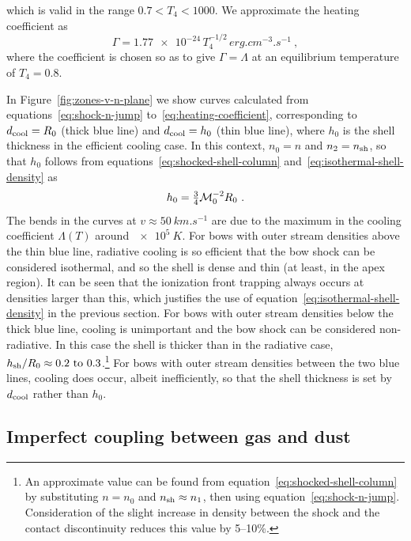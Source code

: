 \message{ !name(dusty-bow-wave.tex)}\documentclass[useAMS, usenatbib, a4paper]{mnras}
\begin{document}
which is valid in the range \(0.7 < T_4 < 1000\).  We approximate the heating coefficient as
\begin{equation}
  \label{eq:heating-coefficient}
  \Gamma = \num{1.77e-24} \, T_4^{-1/2} \, \si{erg.cm^{-3}.s^{-1}} \ ,
\end{equation}
where the coefficient is chosen so as to give \(\Gamma = \Lambda\) at
an equilibrium temperature of \(T_4 = 0.8\).

In Figure~\ref{fig:zones-v-n-plane} we show curves calculated from
equations~\eqref{eq:shock-n-jump} to~\eqref{eq:heating-coefficient},
corresponding to \(d_{\text{cool}} = R_0\) (thick blue line) and
\(d_{\text{cool}} = h_0\) (thin blue line), where \(h_0\) is the shell
thickness in the efficient cooling case.  In this context, \(n_0 = n\)
and \(n_2 = n_{\text{sh}}\), so that \(h_0\) follows from
equations~\eqref{eq:shocked-shell-column}
and~\eqref{eq:isothermal-shell-density} as
\begin{equation}
  \label{eq:strong-cooling-h0}
  h_0 = \tfrac34 \mathcal{M}_0^{-2} R_0 \ .
\end{equation}
The bends in the curves at \(v \approx \SI{50}{km.s^{-1}}\) are due to the
maximum in the cooling coefficient \(\Lambda(T)\) around
\(\SI{e5}{K}\).  For bows with outer stream densities above the thin
blue line, radiative cooling is so efficient that the bow shock can be
considered isothermal, and so the shell is dense and thin (at least,
in the apex region).  It can be seen that the ionization front
trapping always occurs at densities larger than this, which justifies
the use of equation~\eqref{eq:isothermal-shell-density} in the
previous section.  For bows with outer stream densities below the
thick blue line, cooling is unimportant and the bow shock can be
considered non-radiative.  In this case the shell is thicker than in
the radiative case,
\(h\shell/R_0 \approx \text{\numrange{0.2}{0.3}}\).\footnote{%
  An approximate value can be found from
  equation~\eqref{eq:shocked-shell-column} by substituting \(n = n_0\)
  and \(n_{\text{sh}} \approx n_1\), then using equation~\eqref{eq:shock-n-jump}.
  Consideration of the slight increase in density between the shock
  and the contact discontinuity reduces this value by 5--10\%.} %
For bows with outer stream densities between the two blue lines,
cooling does occur, albeit inefficiently, so that the shell thickness
is set by \(d_{\text{cool}}\) rather than \(h_0\).

\subsection{Imperfect coupling between gas and dust}
\label{sec:imperf-coupl-betw}
\end{document}
